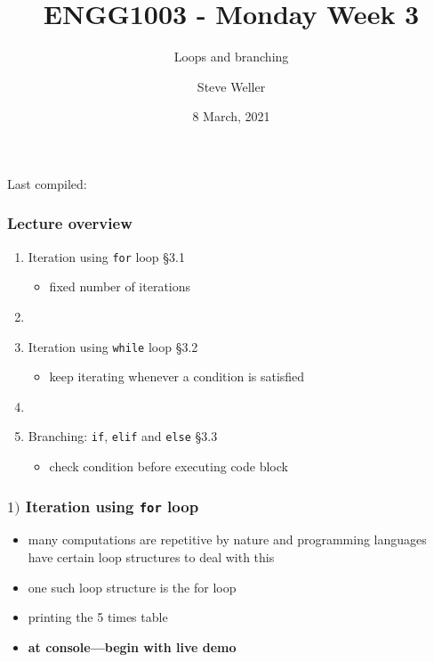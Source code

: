 \documentclass[english,14pt]{beamer}
\title{ENGG1003 - Monday Week 3}
\subtitle{Loops and branching}
\author{Steve Weller}
\institute{University of Newcastle}
\date{8 March, 2021}
\newcommand\red[1]{{\color{red} #1}}
\begin{document}
\begin{flushleft}
{\scriptsize Last compiled:~\DTMnow}
\vspace*{-5mm}
\end{flushleft}
\framebreak


\begin{frame}[fragile]

\frametitle{Lecture overview}
\begin{enumerate}
	\item Iteration using \texttt{for} loop \red{\S3.1}
	\begin{itemize}
		\item fixed number of iterations
	\end{itemize}

	\item[]
	
	\item Iteration using \texttt{while} loop \red{\S3.2}
		\begin{itemize}
			\item keep iterating whenever a condition is satisfied
		\end{itemize}

	\item[]
	
	\item Branching: \texttt{if}, \texttt{elif} and \texttt{else} \red{\S3.3}
		\begin{itemize}
			\item check condition before executing code block
		\end{itemize}
		
\end{enumerate}

\end{frame}


\begin{frame}[fragile]

\frametitle{$1)$ Iteration using \texttt{for} loop}

\begin{itemize}
	\item many computations are repetitive by nature and programming languages have certain loop structures to deal with this
	\item one such loop structure is the for loop
	\item printing the 5 times table
	\item \textbf{at console---begin with live demo}
\end{itemize}


\end{frame}
\end{document}
